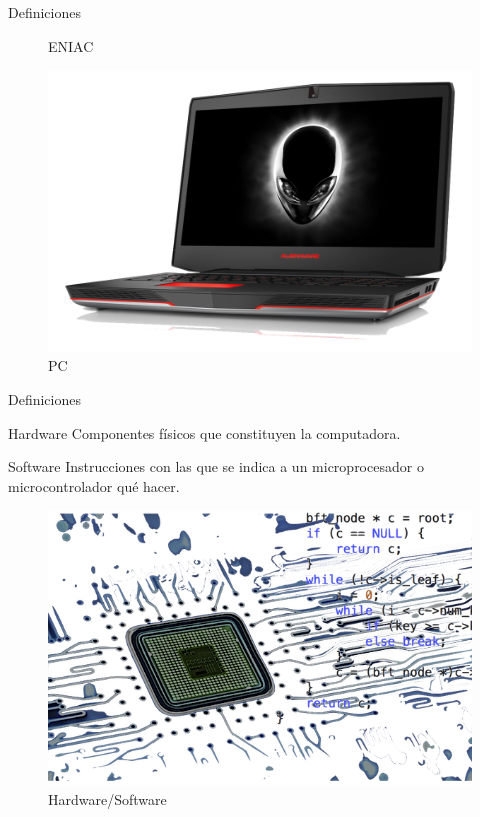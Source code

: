 \documentclass{beamer}
\begin{document}
\begin{frame}[t]{Definiciones}
\begin{multicols}{3}
\begin{figure}
	\caption{ENIAC}
\end{figure}
\begin{figure}
	\centering
	\includegraphics[scale=0.1]{alienware}
	\caption{PC}
\end{figure}
\end{multicols}
\end{frame}

\begin{frame}[t]{Definiciones}\vspace{4pt}
\begin{block}{Hardware}
	Componentes físicos que constituyen la computadora.
\end{block}
\begin{block}{Software}
	Instrucciones con las que se indica a un microprocesador o microcontrolador qué hacer.
\end{block}
\begin{figure}
	\centering
	\includegraphics[scale=0.5]{hwsw}
	\caption{Hardware/Software}
\end{figure}
\end{frame}
\end{document}
